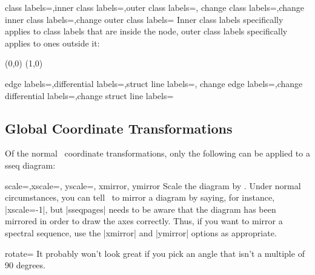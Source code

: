 \documentclass{ltxdoc}
\begin{document}
\begin{sseqdata}[name=ex1,degree={#1}{1-#1}]
\begin{keylist}{class labels=,inner class labels=,outer class labels=,
                change class labels=,change inner class labels=,change outer class labels=}
Inner class labels specifically applies to class labels that are inside the node, outer class labels specifically applies to ones outside it:
\begin{codeexample}[]
\begin{sseqpage}[no axes, classes={inner sep=0.1cm},
    outer class labels={red},
    inner class labels={blue}]
\class["a", "b" above](0,0)
\class["a", "c" right](1,0)
\end{sseqpage}
\end{codeexample}
\end{keylist}


\begin{keylist}{edge labels=,differential labels=,struct line labels=,
                change edge labels=,change differential labels=,change struct line labels=}

\end{keylist}


\subsection{Global Coordinate Transformations}
Of the normal \tikzname\ coordinate transformations, only the following can be applied to a sseq diagram:
\begin{keylist}{scale=,xscale=, yscale=, xmirror, ymirror}
Scale the diagram by . Under normal circumstances, you can tell \tikzname\ to mirror a diagram by saying, for instance, |xscale=-1|, but |sseqpages| needs to be aware that the diagram has been mirrored in order to draw the axes correctly. Thus, if you want to mirror a spectral sequence, use the |xmirror| and |ymirror| options as appropriate.
\end{keylist}

\begin{key}{rotate=}
It probably won't look great if you pick an angle that isn't a multiple of 90 degrees.
\end{key}


\end{sseqdata}
\end{document}
